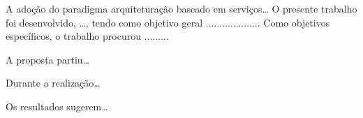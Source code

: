 
\vspace{5mm}

 
\vspace{5mm} 





\vspace{5mm}
\noindent
A adoção do paradigma arquiteturação baseado em serviços\ldots 
O presente trabalho foi desenvolvido, \ldots, tendo como 
objetivo geral .................... Como objetivos específicos, o trabalho
procurou .........

\vspace{5mm}
\noindent
A proposta partiu\ldots

\vspace{5mm}
\noindent
Durante a realização\ldots

\vspace{5mm}
\noindent
Os resultados sugerem\ldots



  
\clearpage




